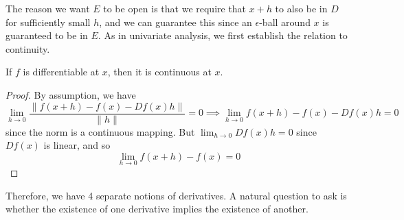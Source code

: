   The reason we want $E$ to be open is that we require that $x + h$ to also be in $D$ for sufficiently small $h$, and we can guarantee this since an $\epsilon$-ball around $x$ is guaranteed to be in $E$. As in univariate analysis, we first establish the relation to continuity. 

	\begin{theorem}
	  \label{thm:differentiability-implies-continuity}
	  If $f$ is differentiable at $x$, then it is continuous at $x$. 
	\end{theorem}
	\begin{proof}
	  By assumption, we have 
		\begin{equation}
			\lim_{h \to 0} \frac{\|f(x + h) - f(x) - Df(x) h\|}{\|h\|} = 0 \implies \lim_{h \to 0} f(x + h) - f(x) - Df(x) h = 0
		\end{equation}
		since the norm is a continuous mapping. But $\lim_{h \to 0} Df(x) h = 0$ since $Df(x)$ is linear, and so 
		\begin{equation}
			\lim_{h \to 0} f(x + h) - f(x) = 0
		\end{equation}
	\end{proof}


  Therefore, we have 4 separate notions of derivatives. A natural question to ask is whether the existence of one derivative implies the existence of another. 

